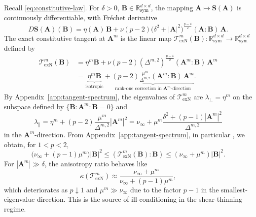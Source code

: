 \documentclass[DIV=16]{scrartcl}
\DeclareMathOperator{\sym}{sym}
\newcommand{\abs}[1]{\left\lvert #1\right\rvert}
\newcommand{\Sstress}{\boldsymbol S} %
\newcommand{\exact}{\mathrm{exN}}
\newcommand{\reg}{\delta}
\newcommand{\pn}{p}
\newcommand{\etaeff}[1]{\eta \left(#1\right)}
\newcommand{\DStress}[2]{D\Sstress \left(#1\right) \left(#2\right)}
\begin{document}
Recall \eqref{eq:constitutive-law}.
For $\reg>0$, $\bm B\in\mathbb{R}^{d\times d}_{\sym}$, the mapping $\bm A\mapsto \Sstress(\bm A)$ is continuously
differentiable, with Fr\'echet derivative
\begin{equation}\label{eq:pns-dstress}
  \DStress{\bm A}{\bm B}
  = \etaeff{\bm A}\,\bm B
  + \nu(\pn-2)\bigl(\reg^2+\abs{\bm A}^2\bigr)^{\frac{\pn-4}{2}}
    (\bm A:\bm B)\,\bm A.
\end{equation}
The exact constitutive tangent at $\bm A^m$ is the linear map $\mathcal
T_{\exact}^m(\bm B)\colon \mathbb{R}^{d\times d}_{\sym}\to \mathbb{R}^{d\times
  d}_{\sym}$ defined by
\begin{equation}\label{eq:local-tangent-exact}
\begin{split}
  \mathcal T_{\exact}^m(\bm B)
  &= \eta^m\bm B
   + \nu(\pn-2)(\Delta^{m,2})^{\frac{\pn-4}{2}}(\bm A^m:\bm B)\,\bm A^m \\
  &= \underbrace{\eta^m\bm B}_{\text{isotropic}}
    + \underbrace{(\pn-2)\frac{\mu^m}{\Delta^{m,2}}(\bm A^m:\bm B)\,\bm A^m}_{\text{rank-one
    correction in $\bm A^m$-direction}}.
\end{split}
\end{equation}
By Appendix~\ref{app:tangent-spectrum}, the eigenvalues of $\mathcal
T_{\exact}^m$ are
$\lambda_\perp=\eta^m$ on the subspace defined by $\{\bm B:\bm A^m:\bm B=0\}$ and
\begin{equation}\label{eq:exact-par-eig}
  \lambda_\parallel
  = \eta^m + (\pn-2)\frac{\mu^m}{\Delta^{m,2}}\abs{\bm A^m}^2
  = \nu_\infty+\mu^m
    \frac{\reg^2+(\pn-1)\abs{\bm A^m}^2}{\Delta^{m,2}}
\end{equation}
in the $\bm A^m$-direction.
From Appendix~\ref{app:tangent-spectrum}, in particular
, we obtain, for $1<\pn < 2$,
\begin{equation}\label{eq:ell-exact}
  \bigl(\nu_\infty+(\pn-1)\mu^m\bigr)\abs{\bm B}^2
  \le (\mathcal T_{\exact}^m(\bm B):\bm B)
  \le (\nu_\infty+\mu^m)\abs{\bm B}^2.
\end{equation}
For $\abs{\bm A^m}\gg\reg$, the anisotropy ratio behaves like
\begin{equation}\label{eq:local-cond-exact}
  \kappa(\mathcal T_{\exact}^m)
  \approx
  \frac{\nu_\infty+\mu^m}{\nu_\infty+(\pn-1)\mu^m},
\end{equation}
which deteriorates as $\pn\downarrow 1$ and $\mu^m\gg\nu_\infty$ due to the
factor $p-1$ in the smallest-eigenvalue direction. This is the source of
ill-conditioning in the shear-thinning regime.
\end{document}
